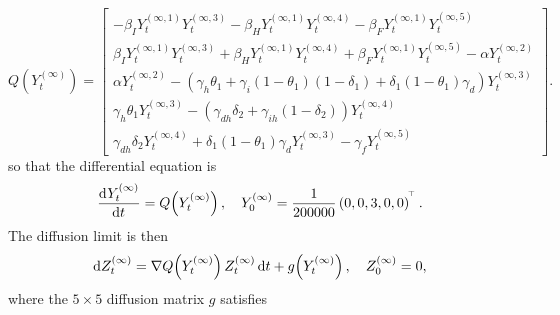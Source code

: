 \[
	Q\!\left(Y_t^{(\infty)}\right) = \begin{bmatrix}
		-\beta_I Y_t^{(\infty, 1)}Y_t^{(\infty, 3)} - \beta_H Y_t^{(\infty, 1)}Y_t^{(\infty, 4)} - \beta_F Y_t^{(\infty, 1)}Y_t^{(\infty,5)}                                                \\
		\beta_I Y_t^{(\infty, 1)}Y_t^{(\infty, 3)} + \beta_H Y_t^{(\infty, 1)}Y_t^{(\infty, 4)} + \beta_F Y_t^{(\infty, 1)}Y_t^{(\infty,5)} - \alpha Y_t^{(\infty, 2)}                      \\
		\alpha Y_t^{(\infty, 2)} - \left(\gamma_h\theta_1 + \gamma_i\left(1 - \theta_1\right)\left(1 - \delta_1\right) + \delta_1\left(1 - \theta_1\right)\gamma_d\right) Y_t^{(\infty, 3)} \\
		\gamma_h\theta_1 Y_t^{(\infty, 3)} - \left(\gamma_{dh}\delta_2 + \gamma_{ih}\left(1 - \delta_2\right) \right) Y_t^{(\infty, 4)}                                                     \\
		\gamma_{dh}\delta_2 Y_t^{(\infty, 4)} + \delta_1\left(1 - \theta_1\right)\gamma_d Y_t^{(\infty, 3)} - \gamma_f Y_t^{(\infty, 5)}
	\end{bmatrix}.
\]
so that the differential equation is
\[
	\dod{Y_t^{(\infty)}}{t} = Q\!\left(Y_t^{(\infty)}\right), \quad Y_0^{(\infty)} = \frac{1}{200000}\left(0, 0, 3, 0, 0\right)^{\T}.
\]
The diffusion limit is then
\[
	\dif Z_t^{(\infty)} = \nabla Q\!\left(Y_t^{(\infty)}\right) Z_t^{(\infty)}\dif t + g\!\left(Y_t^{(\infty)}\right), \quad Z_0^{(\infty)} = 0,
\]
where the \(5\times 5\) diffusion matrix \(g\) satisfies

